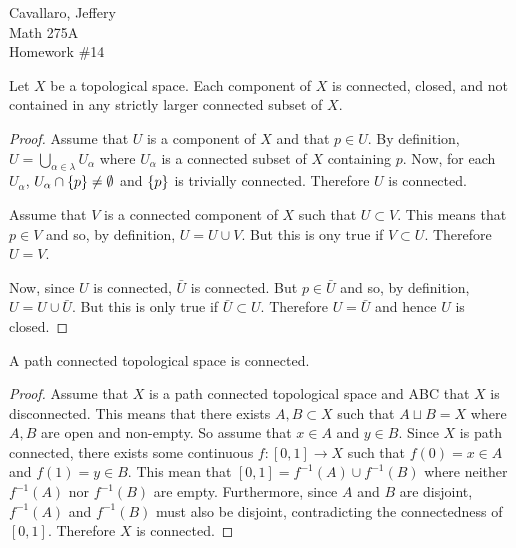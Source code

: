 \documentclass[letterpaper,12pt,fleqn]{article}
\renewcommand{\a}{\alpha}
\renewcommand{\l}{\lambda}
\begin{document}
Cavallaro, Jeffery \\
Math 275A \\
Homework \#14

\bigskip

\begin{theorem}[8.18]
  Let \(X\) be a topological space.  Each component of \(X\) is connected, closed, and not contained in any
  strictly larger connected subset of \(X\).
\end{theorem}

\begin{proof}
  Assume that \(U\) is a component of \(X\) and that \(p\in U\).  By definition, \(U=\bigcup_{\a\in\l}U_{\a}\)
  where \(U_{\a}\) is a connected subset of \(X\) containing \(p\).  Now, for each \(U_{\a}\),
  \(U_{\a}\cap\set{p}\ne\emptyset\) and \(\{p\}\) is trivially connected.  Therefore \(U\) is connected.

  Assume that \(V\) is a connected component of \(X\) such that \(U\subset V\).  This means that \(p\in V\) and
  so, by definition, \(U=U\cup V\).  But this is ony true if \(V\subset U\).  Therefore \(U=V\).

  Now, since \(U\) is connected, \(\bar{U}\) is connected.  But \(p\in\bar{U}\) and so, by definition,
  \(U=U\cup\bar{U}\).  But this is only true if \(\bar{U}\subset U\).  Therefore \(U=\bar{U}\) and hence \(U\) is
  closed.
\end{proof}

\begin{theorem}[8.35]
  A path connected topological space is connected.
\end{theorem}

\begin{proof}
  Assume that \(X\) is a path connected topological space and ABC that \(X\) is disconnected.  This means that
  there exists \(A,B\subset X\) such that \(A\sqcup B=X\) where \(A,B\) are open and non-empty.  So assume that
  \(x\in A\) and \(y\in B\).  Since \(X\) is path connected, there exists some continuous \(f:[0,1]\to X\) such
  that \(f(0)=x\in A\) and \(f(1)=y\in B\).  This mean that \([0,1]=f^{-1}(A)\cup f^{-1}(B)\) where neither
  \(f^{-1}(A)\) nor \(f^{-1}(B)\) are empty.  Furthermore, since \(A\) and \(B\) are disjoint, \(f^{-1}(A)\) and
  \(f^{-1}(B)\) must also be disjoint, contradicting the connectedness of \([0,1]\).  Therefore \(X\) is
  connected.
\end{proof}
\end{document}
